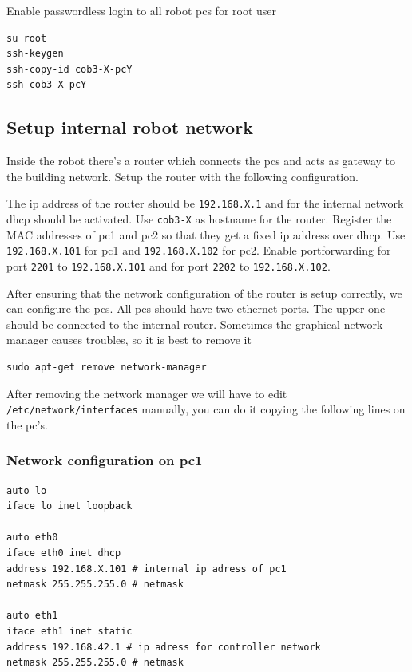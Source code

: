 Enable passwordless login to all robot pcs for root user
\begin{lstlisting}
su root
ssh-keygen
ssh-copy-id cob3-X-pcY
ssh cob3-X-pcY
\end{lstlisting}

\subsection{Setup internal robot network}\label{sec:network}
Inside the robot there's a router which connects the pcs and acts as gateway to the building network. Setup the router with the following configuration. 

The ip address of the router should be \texttt{192.168.X.1} and for the internal network dhcp should be activated. Use \texttt{cob3-X} as hostname for the router. Register the MAC addresses of pc1 and pc2 so that they get a fixed ip address over dhcp. Use \texttt{192.168.X.101} for pc1 and \texttt{192.168.X.102} for pc2. Enable portforwarding for port \texttt{2201} to \texttt{192.168.X.101} and for port \texttt{2202} to \texttt{192.168.X.102}.

After ensuring that the network configuration of the router is setup correctly, we can configure the pcs. All pcs should have two ethernet ports. The upper one should be connected to the internal router. Sometimes the graphical network manager causes troubles, so it is best to remove it
\begin{lstlisting}
sudo apt-get remove network-manager
\end{lstlisting}

After removing the network manager we will have to edit \texttt{/etc/network/interfaces} manually,  you can do it copying the following lines on the pc's.

\subsubsection{Network configuration on pc1}

\begin{lstlisting}
auto lo
iface lo inet loopback

auto eth0
iface eth0 inet dhcp
address 192.168.X.101 # internal ip adress of pc1
netmask 255.255.255.0 # netmask

auto eth1
iface eth1 inet static
address 192.168.42.1 # ip adress for controller network
netmask 255.255.255.0 # netmask
\end{lstlisting}

